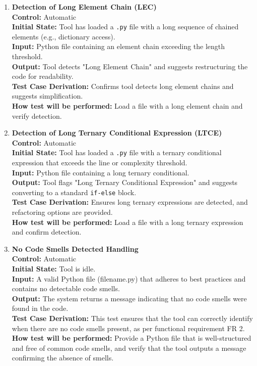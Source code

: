 \documentclass[12pt, titlepage]{article}
\begin{document}
\begin{enumerate}[label={\bf \textcolor{Maroon}{test-FR-CSD-\arabic*}}, wide=0pt, font=\itshape]
  \item \textbf{Detection of Long Element Chain (LEC)}\\[2mm]
    \textbf{Control:} Automatic \\
    \textbf{Initial State:} Tool has loaded a \texttt{.py} file with a long sequence of chained elements (e.g., dictionary access).\\
    \textbf{Input:} Python file containing an element chain exceeding the length threshold.\\
    \textbf{Output:} Tool detects "Long Element Chain" and suggests restructuring the code for readability.\\[2mm]
    \textbf{Test Case Derivation:} Confirms tool detects long element chains and suggests simplification.\\[2mm]
    \textbf{How test will be performed:} Load a file with a long element chain and verify detection.

  \item \textbf{Detection of Long Ternary Conditional Expression (LTCE)}\\[2mm]
    \textbf{Control:} Automatic \\
    \textbf{Initial State:} Tool has loaded a \texttt{.py} file with a ternary conditional expression that exceeds the line or complexity threshold.\\
    \textbf{Input:} Python file containing a long ternary conditional.\\
    \textbf{Output:} Tool flags "Long Ternary Conditional Expression" and suggests converting to a standard \texttt{if-else} block.\\[2mm]
    \textbf{Test Case Derivation:} Ensures long ternary expressions are detected, and refactoring options are provided.\\[2mm]
    \textbf{How test will be performed:} Load a file with a long ternary expression and confirm detection.


  \item \textbf{No Code Smells Detected Handling}\\[2mm]
    \textbf{Control:} Automatic \\
    \textbf{Initial State:} Tool is idle.\\
    \textbf{Input:} A valid Python file (filename.py) that adheres to best practices and contains no detectable code smells.\\
    \textbf{Output:} The system returns a message indicating that no code smells were found in the code.\\[2mm]
    \textbf{Test Case Derivation:} This test ensures that the tool can correctly identify when there are no code smells present, as per functional requirement FR 2.\\[2mm]
    \textbf{How test will be performed:} Provide a Python file that is well-structured and free of common code smells, and verify that the tool outputs a message confirming the absence of smells.

\end{enumerate}
\end{document}
